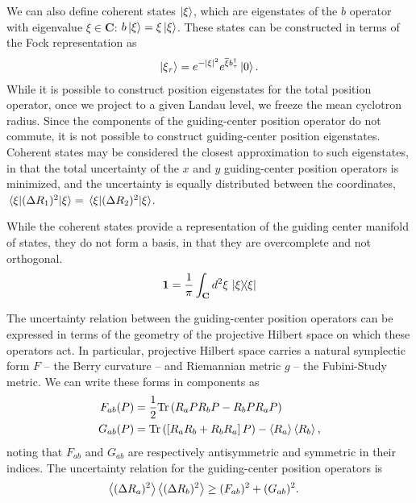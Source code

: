 \documentclass[aps,prb,twocolumn,letterpaper,twoside,nobalancelastpage,groupedaddress,amsmath,amssymb,floatfix,citeautoscript]{revtex4-1}
\begin{document}
We can also define coherent states $\ket{\xi}$, which are eigenstates of the $b$ operator with eigenvalue $\xi \in \mathbf{C}$: $b\ket{\xi} = \xi \ket{\xi}$. These states can be constructed in terms of the Fock representation as
\begin{align*}
\ket{\xi_{\tau}} = e^{-|\xi|^2}e^{\overline{\xi}b_{\tau}^{\dag}}\ket{0}.
\end{align*}
While it is possible to construct position eigenstates for the total position operator, once we project to a given Landau level, we freeze the mean cyclotron radius. Since the components of the guiding-center position operator do not commute, it is not possible to construct guiding-center position eigenstates. Coherent states may be considered the closest approximation to such eigenstates, in that the total uncertainty of the $x$ and $y$ guiding-center position operators is minimized, and the uncertainty is equally distributed between the coordinates,
$\mel{\xi}{(\Delta R_1)^2}{\xi} = \mel{\xi}{(\Delta R_2)^2}{\xi}$. 

While the coherent states provide a representation of the guiding center manifold of states, they do not form a basis, in that they are overcomplete and not orthogonal.
\begin{align*}
\mathbf{1} = \frac{1}{\pi}\int_{\mathbf{C}} d^2\xi\, \dyad{\xi}
\end{align*}

The uncertainty relation between the guiding-center position operators can be expressed in terms of the geometry of the projective Hilbert space on which these operators act. In particular, projective Hilbert space carries a natural symplectic form $F$ -- the Berry curvature -- and Riemannian metric $g$ -- the Fubini-Study metric\cite{provost_riemannian_1980}. We can write these forms in components as
\begin{align*}
F_{ab}(P) &= \frac{1}{2}\text{Tr}\left(R_a P R_b P - R_b P R_a P\right)\\
G_{ab}(P) &= \text{Tr}\left(\left[R_aR_b + R_bR_a\right] P\right) - \expval{R_a}\expval{R_b}, 
\end{align*}
noting that $F_{ab}$ and $G_{ab}$ are respectively antisymmetric and symmetric in their indices.
The uncertainty relation for the guiding-center position operators is
\begin{align*}
\expval{(\Delta R_a)^2}\expval{(\Delta R_b)^2} &\geq (F_{ab})^2 + (G_{ab})^2.
\end{align*}
\end{document}
